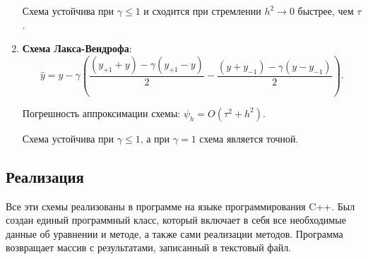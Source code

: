\documentclass[12pt, a4paper]{article}
\begin{document}
\begin{enumerate}
	Схема устойчива при $\gamma \leq 1 $ и сходится при стремлении $h^2 \to 0$ быстрее, чем $\tau$.
	\bigskip
	\item \textbf{Схема Лакса-Вендрофа}:
	\begin{equation*}
		\widehat{y} = y - \gamma(\dfrac{(y_{+1} + y) - \gamma (y_{+1} - y)}{2} -  \dfrac{(y + y_{-1}) - \gamma (y - y_{-1})}{2}).
		\label{s6}
	\end{equation*}
	
	Погрешность аппроксимации схемы: 
	$\psi_h = O(\tau^2 + h^2)$.
	
	Схема устойчива при $\gamma \leq 1 $, а при $\gamma = 1$ схема является точной. 
	
\end{enumerate}

\subsection{Реализация}

Все эти схемы реализованы в программе на языке программирования C++. Был создан единый программный класс, который включает в себя все необходимые данные об уравнении и методе, а также сами реализации методов. Программа возвращает массив с результатами, записанный в текстовый файл.
\end{document}
